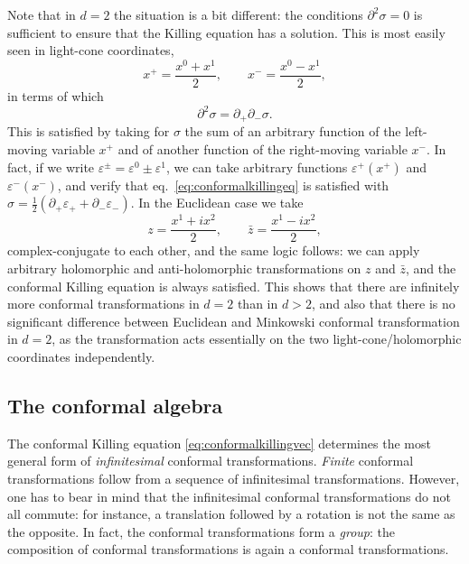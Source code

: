 \documentclass[a4paper,12pt]{article}
\numberwithin{equation}{section}
\begin{document}
Note that in $d = 2$ the situation is a bit different: the conditions $\partial^2 \sigma = 0$ is sufficient to ensure that the Killing equation has a solution. This is most easily seen in light-cone coordinates,
\begin{equation}
	x^+ = \frac{x^0 + x^1}{2},
	\qquad
	x^- = \frac{x^0 - x^1}{2},
\end{equation}
in terms of which
\begin{equation}
	\partial^2 \sigma = \partial_+ \partial_- \sigma.
\end{equation}
This is satisfied by taking for $\sigma$ the sum of an arbitrary function of the left-moving variable $x^+$ and of another function of the right-moving variable $x^-$. In fact, if we write $\varepsilon^\pm = \varepsilon^0 \pm \varepsilon^1$, we can 	take arbitrary functions $\varepsilon^+(x^+)$ and $\varepsilon^-(x^-)$, and verify that eq.~\eqref{eq:conformalkillingeq} is satisfied with $\sigma = \frac{1}{2} \left( \partial_+ \varepsilon_+ + \partial_- \varepsilon_- \right)$.
In the Euclidean case we take
\begin{equation}
	z = \frac{x^1 + i x^2}{2},
	\qquad
	\bar{z} = \frac{x^1 - i x^2}{2},
\end{equation}
complex-conjugate to each other, and the same logic follows: we can apply arbitrary holomorphic and anti-holomorphic transformations on $z$ and $\bar{z}$, and the conformal Killing equation is always satisfied. This shows that there are infinitely more conformal transformations in $d = 2$ than in $d > 2$, and also that there is no significant difference between Euclidean and Minkowski conformal transformation in $d = 2$, as the transformation acts essentially on the two light-cone/holomorphic coordinates independently.


\subsection{The conformal algebra}

The conformal Killing equation \eqref{eq:conformalkillingvec} determines the most general form of \emph{infinitesimal} conformal transformations. \emph{Finite} conformal transformations follow from a sequence of infinitesimal transformations.
However, one has to bear in mind that the infinitesimal conformal transformations do not all commute: for instance, a translation followed by a rotation is not the same as the opposite.
In fact, the conformal transformations form a \emph{group}: the composition of conformal transformations is again a conformal transformations.
\end{document}
